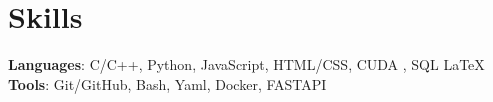 
\section{Skills}
 \begin{itemize}[leftmargin=0.15in, label={}]
    \small{\item{
    
     \textbf{Languages}{: C/C++, Python, JavaScript, HTML/CSS, CUDA , SQL \LaTeX} \\
     
     \textbf{Tools}{: Git/GitHub, Bash, Yaml, Docker, FASTAPI }
    }}
 \end{itemize}


